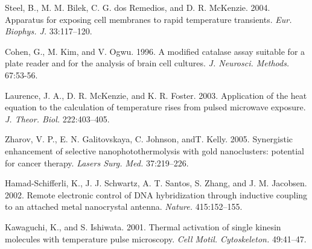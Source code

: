\documentclass{biophys}
\newcommand{\BibTeX}{\textsc{Bib}\TeX}       %
\begin{document}
\begin{thebibliography}{99}
Steel, B., M. M. Bilek, C. G. dos Remedios, and D. R. McKenzie. 2004. Apparatus for exposing cell membranes to rapid temperature transients. {\it Eur. Biophys. J.} 33:117--120.

Cohen, G., M. Kim, and V. Ogwu. 1996. A modified catalase assay suitable for a plate reader and for the analysis of brain cell cultures. {\it J. Neurosci. Methods.} 67:53-56.


Laurence, J. A., D. R. McKenzie, and K. R. Foster. 2003. Application of the heat equation to the calculation of temperature rises from pulsed microwave exposure. {\it J. Theor. Biol.} 222:403--405.



Zharov, V. P., E. N. Galitovskaya, C. Johnson, and\break T. Kelly. 2005. \pagebreak Synergistic enhancement of selective nanophotothermolysis with gold nanoclusters: potential for cancer therapy. {\it Lasers Surg. Med.} 37:219--226.

Hamad-Schifferli, K., J. J. Schwartz, A. T. Santos, S. Zhang, and J. M. Jacobsen. 2002. Remote electronic control of DNA hybridization through inductive coupling to an attached metal nanocrystal antenna. {\it Nature.} 415:152--155.


Kawaguchi, K., and S. Ishiwata. 2001. Thermal activation of single kinesin molecules with temperature pulse microscopy. {\it Cell Motil. Cytoskeleton.} 49:41--47.

\end{thebibliography}




\end{document}
